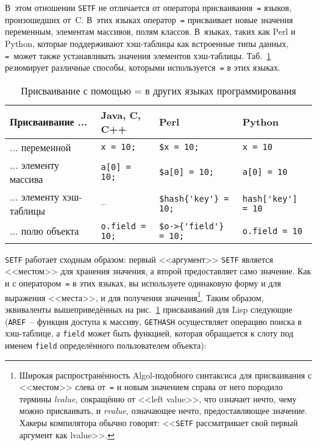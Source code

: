 В~этом отношении \lstinline{SETF} не отличается от оператора присваивания~\lstinline{=} языков,
произошедших от~C. В~этих языках оператор~\lstinline{=} присваивает новые значения переменным,
элементам массивов, полям классов. В~языках, таких как Perl и Python, которые поддерживают
хэш-таблицы как встроенные типы данных, \lstinline{=}~может также устанавливать значения
элементов хэш-таблицы. Таб.~\ref{table:06-1} резюмирует различные способы, которыми
используется~\lstinline{=} в этих языках.

\begin{table}[tbh]
\begin{tabular}{|m{42mm}|>{\centering}m{23mm}|>{\centering}m{30mm}|>{\centering}m{25mm}|}
\hline
Присваивание ...         & Java, C, C++        & Perl                & Python \\
\hline
... переменной           & \lstinline!x = 10;! & \lstinline!$x = 10;! & \lstinline!x = 10! \\
... элементу массива     & \lstinline!a[0] = 10;! & \lstinline!$a[0] = 10;! & \lstinline!a[0] = 10! \\
... элементу хэш-таблицы & --                  & \lstinline!$hash{'key'} = 10;!  & \lstinline!hash['key'] = 10! \\
... полю объекта         & \lstinline!o.field = 10;! & \lstinline!$o->{'field'} = 10;! & \lstinline!o.field = 10! \\
\hline
\end{tabular}
  \caption{Присваивание с помощью = в других языках программирования} 
  \label{table:06-1}
\end{table}


\lstinline{SETF} работает сходным образом: первый <<аргумент>> \lstinline{SETF} является
<<местом>> для хранения значения, а второй предоставляет само значение. Как и с оператором~\lstinline{=}
в этих языках, вы используете одинаковую форму и для выражения <<места>>, и для
получения значения\footnote{Широкая распространённость Algol-подобного синтаксиса для
  присваивания с <<местом>> слева от~\lstinline{=} и новым значением справа от него породило термины
  \textit{lvalue}, сокращённо от <<left value>>, что означает нечто, чему можно
  присваивать, и \textit{rvalue}, означающее нечто, предоставляющее значение. Хакеры
  компилятора обычно говорят: <<\lstinline{SETF} рассматривает свой первый аргумент как
  lvalue>>.}\hspace{\footnotenegspace}. Таким образом, эквиваленты вышеприведённых на рис.~\ref{table:06-1} присваиваний для
Lisp следующие (\lstinline{AREF}~-- функция доступа к массиву, \lstinline{GETHASH} осуществляет
операцию поиска в хэш-таблице, а \lstinline{field} может быть функцией, которая обращается к слоту под
именем \lstinline{field} определённого пользователем объекта):

